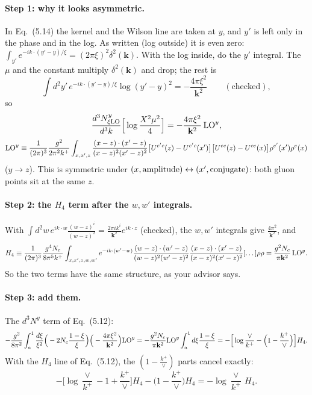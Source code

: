 \documentclass[10pt]{article}
\numberwithin{equation}{section}
\newcommand{\LO}{{\rm LO}}
\begin{document}
\paragraph{Step 1: why it looks asymmetric.} In Eq.~(5.14) the kernel and the Wilson line are taken at $y$, and $y'$ is left only in the phase and in the log. As written (log outside) it is even zero: $\int_{y'}e^{-ik\cdot(y'-y)/\xi}=(2\pi\xi)^2\delta^2(\mathbf k)$. With the log inside, do the $y'$ integral. The $\mu$ and the constant multiply $\delta^2(\mathbf k)$ and drop; the rest is
\begin{equation}
\int d^2y'\,e^{-ik\cdot(y'-y)/\xi}\log(y'-y)^2=-\frac{4\pi\xi^2}{\mathbf k^2}\qquad(\text{checked}),
\end{equation}
so
\begin{equation}
\frac{d^3N^y_{\xi\rm LO}}{d^3k}\Big[\log\frac{X^2\mu^2}{4}\Big]=-\frac{4\pi\xi^2}{\mathbf k^2}\,\LO^{y},\end{equation}\begin{equation}
\LO^{y}\equiv\frac{1}{(2\pi)^3}\frac{g^2}{2\pi^2k^+}\int_{x,x',z}\frac{(x-z)\cdot(x'-z)}{(x-z)^2(x'-z)^2}\big[U^{e'c}(z)-U^{e'c}(x')\big]\big[U^{ec}(z)-U^{ce}(x)\big]\rho^{e'}(x')\rho^{e}(x)\label{eq:LOy}
\end{equation}
($y\to z$). This is symmetric under $(x,{\rm amplitude})\leftrightarrow(x',{\rm conjugate})$: both gluon points sit at the same $z$.
\paragraph{Step 2: the $H_4$ term after the $w,w'$ integrals.} With $\int d^2w\,e^{ik\cdot w}\frac{(w-z)^i}{(w-z)^2}=\frac{2\pi ik^i}{\mathbf k^2}e^{ik\cdot z}$ (checked), the $w,w'$ integrals give $\frac{4\pi^2}{\mathbf k^2}$, and
\begin{equation}
H_4\equiv\frac{1}{(2\pi)^{3}}\frac{g^{4}N_{c}}{8\pi^{5}k^{+}}\int_{x,x',z,w,w'}e^{-ik\cdot(w'-w)}\frac{(w-z)\cdot(w'-z)}{(w-z)^{2}(w'-z)^{2}}\frac{(x-z)\cdot(x'-z)}{(x-z)^{2}(x'-z)^{2}}[\dots]\rho\rho=\frac{g^2N_c}{\pi\mathbf k^2}\,\LO^{y}.
\end{equation}
So the two terms have the same structure, as your advisor says.
\paragraph{Step 3: add them.} The $d^3N^y$ term of Eq.~(5.12):
\begin{equation}
-\frac{g^2}{8\pi^2}\int_a^1\frac{d\xi}{\xi^2}\Big(-2N_c\frac{1-\xi}{\xi}\Big)\Big(-\frac{4\pi\xi^2}{\mathbf k^2}\Big)\LO^y=-\frac{g^2N_c}{\pi\mathbf k^2}\LO^y\int_a^1d\xi\frac{1-\xi}{\xi}=-\Big[\log\frac{\vee}{k^+}-\Big(1-\frac{k^+}{\vee}\Big)\Big]H_4 .
\end{equation}
With the $H_4$ line of Eq.~(5.12), the $(1-\frac{k^+}{\vee})$ parts cancel exactly:
\begin{equation}
-\Big[\log\frac{\vee}{k^+}-1+\frac{k^+}{\vee}\Big]H_4-\Big(1-\frac{k^+}{\vee}\Big)H_4=-\log\frac{\vee}{k^+}\,H_4 .\label{eq:sum}
\end{equation}
\end{document}
